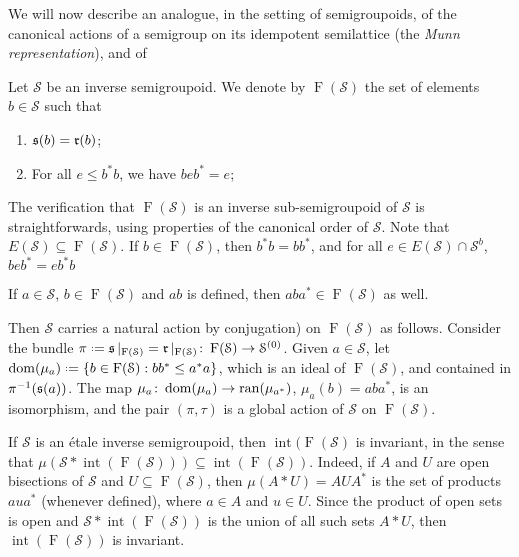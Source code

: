 \begin{example}\label{ex:munn}
    We will now describe an analogue, in the setting of semigroupoids, of the canonical actions of a semigroup on its idempotent semilattice (the \emph{Munn representation}), and of 
    
    Let $\mathcal{S}$ be an inverse semigroupoid. We denote by $\operatorname{F}(\mathcal{S})$ the set of elements $b\in\mathcal{S}$ such that
    \begin{enumerate}[label=(\roman*)]
        \item $\operatorname{\mathfrak{s}}(b)=\operatorname{\mathfrak{r}}(b)$;
        \item For all $e\leq b^*b$, we have $beb^*=e$;
    \end{enumerate}
    
    The verification that $\operatorname{F}(\mathcal{S})$ is an inverse sub-semigroupoid of $\mathcal{S}$ is straightforwards, using properties of the canonical order of $\mathcal{S}$. Note that $E(\mathcal{S})\subseteq\operatorname{F}(\mathcal{S})$. If $b\in\operatorname{F}(\mathcal{S})$, then $b^*b=bb^*$, and for all $e\in E(\mathcal{S})\cap\mathcal{S}^b$, $beb^*=eb^*b$
    
    If $a\in\mathcal{S}$, $b\in\operatorname{F}(\mathcal{S})$ and $ab$ is defined, then $aba^*\in\operatorname{F}(\mathcal{S})$ as well.
    
    Then $\mathcal{S}$ carries a natural action by conjugation) on $\operatorname{F}(\mathcal{S})$ as follows. Consider the bundle $\pi\defeq\so|_{\operatorname{F}(\mathcal{S})}=\ra|_{\operatorname{F}(\mathcal{S})}\colon\operatorname{F}(\mathcal{S})\to\mathcal{S}^{(0)}$. Given $a\in\mathcal{S}$, let $\dom(\mu_a)\defeq\left\{b\in\operatorname{F}(\mathcal{S}):bb^*\leq a^*a\right\}$, which is an ideal of $\operatorname{F}(\mathcal{S})$, and contained in $\pi^{-1}(\operatorname{\mathfrak{s}}(a))$. The map $\mu_a\colon\operatorname{dom}(\mu_a)\to\operatorname{ran}(\mu_{a^*})$, $\mu_a(b)=aba^*$, is an isomorphism, and the pair $(\pi,\tau)$ is a global action of $\mathcal{S}$ on $\operatorname{F}(\mathcal{S})$.
    
    If $\mathcal{S}$ is an étale inverse semigroupoid, then $\operatorname{int}(\operatorname{F}(\mathcal{S})$ is invariant, in the sense that $\mu(\mathcal{S}\ast\operatorname{int}(\operatorname{F}(\mathcal{S})))\subseteq \operatorname{int}(\operatorname{F}(\mathcal{S}))$. Indeed, if $A$ and $U$ are open bisections of $\mathcal{S}$ and $U\subseteq\operatorname{F}(\mathcal{S})$, then $\mu(A\ast U)=AUA^*$ is the set of products $aua^*$ (whenever defined), where $a\in A$ and $u\in U$. Since the product of open sets is open and $\mathcal{S}\ast\operatorname{int}(\operatorname{F}(\mathcal{S}))$ is the union of all such sets $A\ast U$, then $\operatorname{int}(\operatorname{F}(\mathcal{S}))$ is invariant.
    

\end{example}

